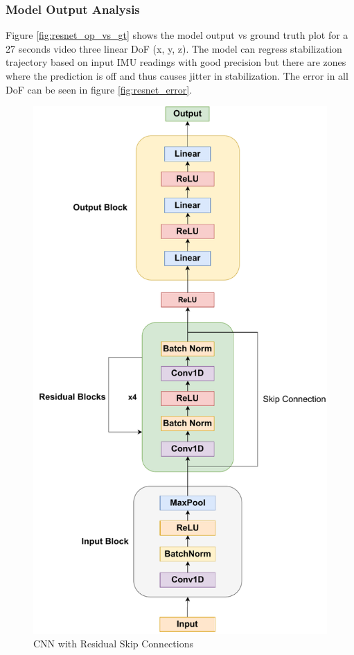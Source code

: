 \subsubsection{Model Output Analysis}
Figure \ref{fig:resnet_op_vs_gt} shows the model output vs ground truth plot for a 27 seconds video three linear DoF (x, y, z). The model can regress stabilization trajectory based on input IMU readings with good precision but there are zones where the prediction is off and thus causes jitter in stabilization. The error in all DoF can be seen in figure \ref{fig:resnet_error}.

\begin{figure}[H]
    \centering
    \includegraphics[scale=0.75]{images/fig_chapter2/nns/resnet_mt.pdf}
    \caption{CNN with Residual Skip Connections}
    \label{fig:resnet_used}
\end{figure}

